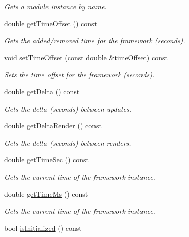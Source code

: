 \begin{DoxyCompactItemize}
\begin{DoxyCompactList}\small\item\em Gets a module instance by name. \end{DoxyCompactList}\item 
double \hyperlink{classflounder_1_1framework_a611e6fcdc2f2f484ebf8bbbdceacd45b}{get\+Time\+Offset} () const
\begin{DoxyCompactList}\small\item\em Gets the added/removed time for the framework (seconds). \end{DoxyCompactList}\item 
void \hyperlink{classflounder_1_1framework_aa4d08f34e622916ecd4a5f5f55bbac88}{set\+Time\+Offset} (const double \&time\+Offset) const
\begin{DoxyCompactList}\small\item\em Sets the time offset for the framework (seconds). \end{DoxyCompactList}\item 
double \hyperlink{classflounder_1_1framework_a46219c3eae921c9819e7228ec2d8d904}{get\+Delta} () const
\begin{DoxyCompactList}\small\item\em Gets the delta (seconds) between updates. \end{DoxyCompactList}\item 
double \hyperlink{classflounder_1_1framework_ae4020c8f9baeda03fe5ef8ceb6f1d286}{get\+Delta\+Render} () const
\begin{DoxyCompactList}\small\item\em Gets the delta (seconds) between renders. \end{DoxyCompactList}\item 
double \hyperlink{classflounder_1_1framework_acac765a2dd8e09267b7d6ce0620b8e55}{get\+Time\+Sec} () const
\begin{DoxyCompactList}\small\item\em Gets the current time of the framework instance. \end{DoxyCompactList}\item 
double \hyperlink{classflounder_1_1framework_a1f60ddf8e191eb9182b3e90007d8f9a1}{get\+Time\+Ms} () const
\begin{DoxyCompactList}\small\item\em Gets the current time of the framework instance. \end{DoxyCompactList}\item 
bool \hyperlink{classflounder_1_1framework_ad217b91b7e0f46f305105045396dcdf3}{is\+Initialized} () const

\end{DoxyCompactItemize}
